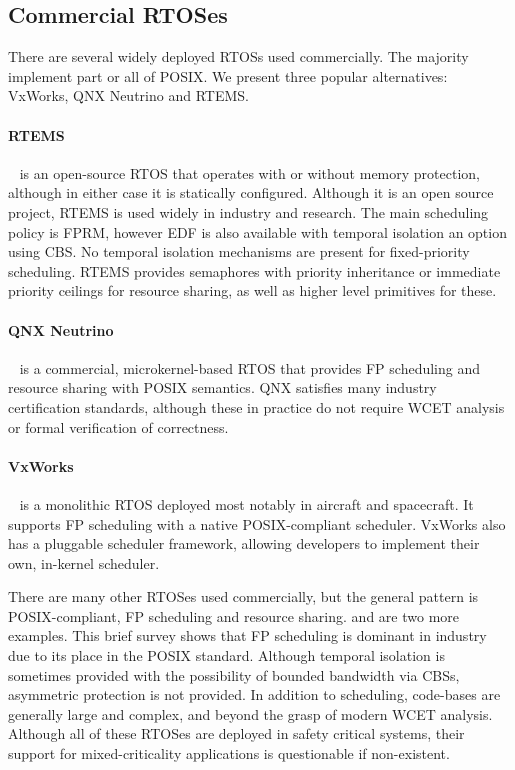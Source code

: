\subsection{Commercial RTOSes}
There are several widely deployed \glspl{RTOS} used commercially. 
The majority implement part or all of \gls{POSIX}.
We present three popular alternatives: VxWorks, QNX Neutrino and RTEMS.

\paragraph{RTEMS}~\citep{RTEMS:URL} is an open-source \gls{RTOS} that operates with or without memory protection, although in either case it is statically configured.
Although it is an open source project, RTEMS is used widely in industry and research.
The main scheduling policy is \gls{FPRM}, however \gls{EDF} is also available with temporal isolation an option using \gls{CBS}.
No temporal isolation mechanisms are present for fixed-priority scheduling.
RTEMS provides semaphores with priority inheritance or immediate priority ceilings for resource sharing, as well as higher level primitives for these. 

\paragraph{QNX Neutrino}~\citep{QNX_2010} is a commercial, microkernel-based \gls{RTOS} that provides \gls{FP} scheduling and resource sharing with POSIX semantics.
QNX satisfies many industry certification standards, although these in practice do not require {\gls{WCET}} analysis or formal verification of correctness.

\paragraph{VxWorks}~\citep{VxWorks_2008} is a monolithic \gls{RTOS} deployed most notably in aircraft and spacecraft. 
It supports \gls{FP} scheduling with a native POSIX-compliant scheduler. 
VxWorks also has a pluggable scheduler framework, allowing developers to implement their own, in-kernel scheduler.

There are many other \gls{RTOS}es used commercially, but the general pattern is POSIX-compliant, \gls{FP} scheduling and resource sharing.
 \citet{Deos:URL} and \citet{PikeOS:URL} are two more examples.
This brief survey shows that \gls{FP} scheduling is dominant in industry due to its place in the POSIX standard. 
Although temporal isolation is sometimes provided with the possibility of bounded bandwidth via \glspl{CBS}, asymmetric protection is not provided.
In addition to scheduling, code-bases are generally large and complex, and beyond the grasp of modern {\gls{WCET}} analysis.
Although all of these \gls{RTOS}es are deployed in safety critical systems, their support for mixed-criticality applications is questionable if non-existent.


